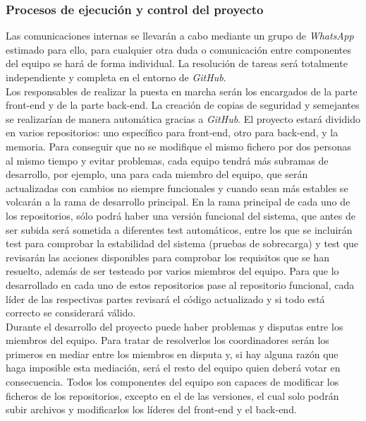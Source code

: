 \documentclass{article}
\begin{document}
\subsubsection{Procesos de ejecución y control del proyecto}
Las comunicaciones internas se llevarán a cabo mediante un grupo de \textit{WhatsApp} estimado para ello, para cualquier otra duda o comunicación entre componentes del equipo se hará de forma individual. La resolución de tareas será totalmente independiente y completa en el entorno de \textit{GitHub}.\\
\hfill \break
Los responsables de realizar la puesta en marcha serán los encargados de la parte front-end y de la parte back-end. La creación de copias de seguridad y semejantes se realizarían de manera automática gracias a \textit{GitHub}. 
\hfill \break
El proyecto estará dividido en varios repositorios: uno específico para front-end, otro para back-end, y la memoria. Para conseguir que no se modifique el mismo fichero por dos personas al mismo tiempo y evitar problemas, cada equipo tendrá más subramas de desarrollo, por ejemplo, una para cada miembro del equipo, que serán actualizadas con cambios no siempre funcionales y cuando sean más estables se volcarán a la rama de desarrollo principal. 
\hfill \break
En la rama principal de cada uno de los repositorios, sólo podrá haber una versión funcional del sistema, que antes de ser subida será sometida a diferentes test automáticos, entre los que se incluirán test para comprobar la estabilidad del sistema (pruebas de sobrecarga) y test que revisarán las acciones disponibles para comprobar los requisitos que se han resuelto, además de ser testeado por varios miembros del equipo. 
\hfill \break
Para que lo desarrollado en cada uno de estos repositorios pase al repositorio funcional, cada líder de las respectivas partes revisará el código actualizado y si todo está correcto se considerará válido. \\
\hfill \break
Durante el desarrollo del proyecto puede haber problemas y disputas entre los miembros del equipo. Para tratar de resolverlos los coordinadores serán los primeros en mediar entre los miembros en disputa y, si hay alguna razón que haga imposible esta mediación, será el resto del equipo quien deberá votar en consecuencia. 
\hfill \break
Todos los componentes del equipo son capaces de modificar los ficheros de los repositorios, excepto en el de las versiones, el cual solo podrán subir archivos y modificarlos los líderes del front-end y el back-end.
\end{document}
